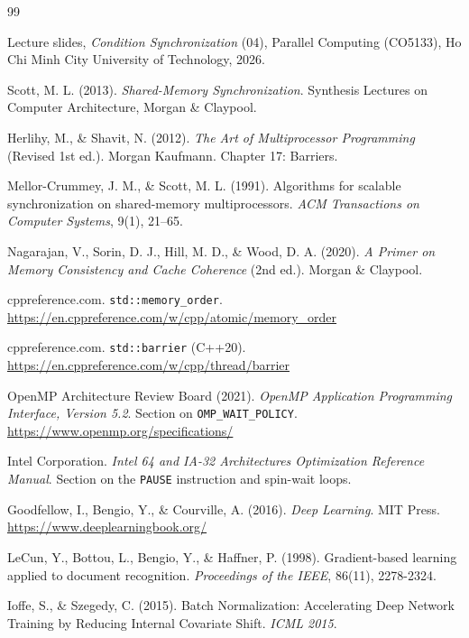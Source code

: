 \documentclass[12pt,a4paper]{article}
\begin{document}
\begin{thebibliography}{99}

Lecture slides, \textit{Condition Synchronization} (04), Parallel Computing (CO5133), Ho Chi Minh City University of Technology, 2026.

Scott, M. L. (2013). \textit{Shared-Memory Synchronization}. Synthesis Lectures on Computer Architecture, Morgan \& Claypool.

Herlihy, M., \& Shavit, N. (2012). \textit{The Art of Multiprocessor Programming} (Revised 1st ed.). Morgan Kaufmann. Chapter 17: Barriers.

Mellor-Crummey, J. M., \& Scott, M. L. (1991). Algorithms for scalable synchronization on shared-memory multiprocessors. \textit{ACM Transactions on Computer Systems}, 9(1), 21--65.

Nagarajan, V., Sorin, D. J., Hill, M. D., \& Wood, D. A. (2020). \textit{A Primer on Memory Consistency and Cache Coherence} (2nd ed.). Morgan \& Claypool.

cppreference.com. \texttt{std::memory\_order}. \url{https://en.cppreference.com/w/cpp/atomic/memory_order}

cppreference.com. \texttt{std::barrier} (C++20). \url{https://en.cppreference.com/w/cpp/thread/barrier}

OpenMP Architecture Review Board (2021). \textit{OpenMP Application Programming Interface, Version 5.2}. Section on \texttt{OMP\_WAIT\_POLICY}. \url{https://www.openmp.org/specifications/}

Intel Corporation. \textit{Intel 64 and IA-32 Architectures Optimization Reference Manual}. Section on the \texttt{PAUSE} instruction and spin-wait loops.

Goodfellow, I., Bengio, Y., \& Courville, A. (2016). \textit{Deep Learning}. MIT Press. \url{https://www.deeplearningbook.org/}

LeCun, Y., Bottou, L., Bengio, Y., \& Haffner, P. (1998). Gradient-based learning applied to document recognition. \textit{Proceedings of the IEEE}, 86(11), 2278-2324.

Ioffe, S., \& Szegedy, C. (2015). Batch Normalization: Accelerating Deep Network Training by Reducing Internal Covariate Shift. \textit{ICML 2015}.


\end{thebibliography}
\end{document}
